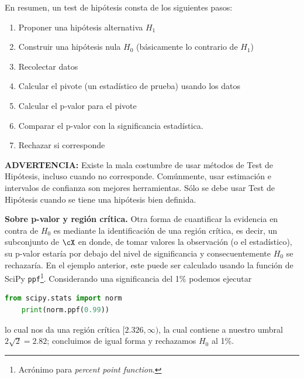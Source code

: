 \begin{tcolorbox}[title=Test de Hipótesis]
En resumen,  un test de hipótesis consta de los siguientes pasos: 

\begin{enumerate}
	\item Proponer una hipótesis alternativa $H_1$
	\item Construir una hipótesis nula $H_0$ (básicamente lo contrario de $H_1$)
	\item Recolectar datos
	\item Calcular el pivote (un estadístico de prueba) usando los datos
	\item Calcular el p-valor para el pivote
	\item Comparar el p-valor con la significancia estadística. 
	\item Rechazar si corresponde
\end{enumerate}
\textbf{ADVERTENCIA: } Existe la mala costumbre de usar métodos de Test de Hipótesis, incluso cuando no corresponde. Comúnmente, usar estimación e intervalos de confianza son mejores herramientas. Sólo se debe usar Test de Hipótesis cuando se tiene una hipótesis bien definida.
\end{tcolorbox}

\textbf{Sobre p-valor y región crítica.}
Otra forma de cuantificar la evidencia en contra de $H_0$ es mediante la identificación de una región crítica, es decir, un subconjunto de $\cX$ en donde, de tomar valores la observación (o el estadístico), su p-valor estaría por debajo del nivel de significancia y consecuentemente $H_0$ se rechazaría. En el ejemplo anterior, este puede ser calculado usando la función de SciPy \texttt{ppf}\footnote{Acrónimo para \emph{percent point function}.}. Considerando una significancia del 1\% podemos ejecutar
\begin{lstlisting}[language=Python]
	from scipy.stats import norm
	print(norm.ppf(0.99))
\end{lstlisting}
lo cual nos da una región crítica $[2.326,\infty)$, la cual contiene a nuestro umbral $2\sqrt{2} = 2.82$; concluimos de igual forma y rechazamos $H_0$ al 1\%. 

